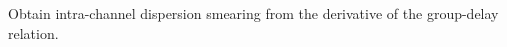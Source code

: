 \TODO\quad Obtain intra-channel dispersion smearing from the derivative of the group-delay relation.
